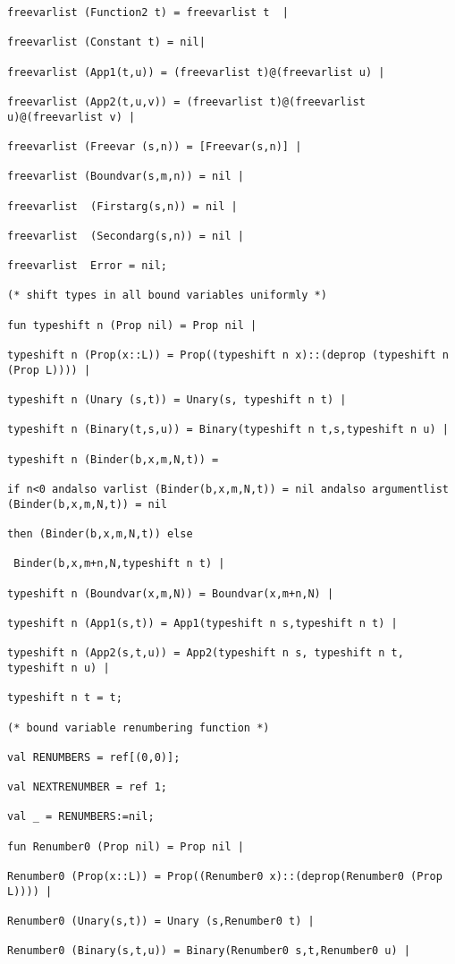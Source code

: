 \documentclass{article}
\begin{document}
{{\begin{verbatim}
freevarlist (Function2 t) = freevarlist t  |

freevarlist (Constant t) = nil|

freevarlist (App1(t,u)) = (freevarlist t)@(freevarlist u) |

freevarlist (App2(t,u,v)) = (freevarlist t)@(freevarlist u)@(freevarlist v) |

freevarlist (Freevar (s,n)) = [Freevar(s,n)] |

freevarlist (Boundvar(s,m,n)) = nil |

freevarlist  (Firstarg(s,n)) = nil |

freevarlist  (Secondarg(s,n)) = nil |

freevarlist  Error = nil;

(* shift types in all bound variables uniformly *)

fun typeshift n (Prop nil) = Prop nil |

typeshift n (Prop(x::L)) = Prop((typeshift n x)::(deprop (typeshift n (Prop L)))) |

typeshift n (Unary (s,t)) = Unary(s, typeshift n t) |

typeshift n (Binary(t,s,u)) = Binary(typeshift n t,s,typeshift n u) |

typeshift n (Binder(b,x,m,N,t)) =

if n<0 andalso varlist (Binder(b,x,m,N,t)) = nil andalso argumentlist (Binder(b,x,m,N,t)) = nil

then (Binder(b,x,m,N,t)) else 

 Binder(b,x,m+n,N,typeshift n t) |

typeshift n (Boundvar(x,m,N)) = Boundvar(x,m+n,N) |

typeshift n (App1(s,t)) = App1(typeshift n s,typeshift n t) |

typeshift n (App2(s,t,u)) = App2(typeshift n s, typeshift n t, typeshift n u) |

typeshift n t = t;

(* bound variable renumbering function *)

val RENUMBERS = ref[(0,0)];

val NEXTRENUMBER = ref 1;

val _ = RENUMBERS:=nil;

fun Renumber0 (Prop nil) = Prop nil |

Renumber0 (Prop(x::L)) = Prop((Renumber0 x)::(deprop(Renumber0 (Prop L)))) |

Renumber0 (Unary(s,t)) = Unary (s,Renumber0 t) |

Renumber0 (Binary(s,t,u)) = Binary(Renumber0 s,t,Renumber0 u) |


\end{verbatim}}}
\end{document}
